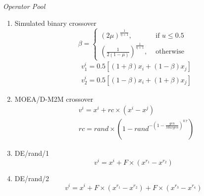\documentclass[journal]{IEEEtran}
\begin{document}
\textit{Operator Pool}
\begin{enumerate}
  \item Simulated binary crossover
        \begin{equation}
          \label{eq:sbx}
          \beta=\left\{\begin{array}{cl}
            (2 \mu)^{\frac{1}{\eta+1}},                         & \text { if } u \leq 0.5 \\
            \left(\frac{1}{2(1-\mu)}\right)^{\frac{1}{\eta+1}}, & \text { otherwise }
          \end{array}\right.
        \end{equation}
        \begin{equation}
          \begin{aligned}
             & v^i_1=0.5\left[(1+\beta) x_{i}+(1-\beta) x_{j}\right] \\
             & v^i_2=0.5\left[(1-\beta) x_{i}+(1+\beta) x_{j}\right]
          \end{aligned}
        \end{equation}
  \item MOEA/D-M2M crossover
        \begin{align}
           & v^{i}=x^{i}+rc \times \left(x^{i}-x^{j}\right)                                                      \\
           & rc={rand} \times \left(1-{rand}^{-\left(1-\frac{\textit{gen}}{\textit{Maxgen}}\right)^{0.7}}\right)
          \label{c_op:m2m}
        \end{align}
  \item DE/rand/1
        \begin{equation}
          v^{i}=x^{i}+F \times\left(x^{r_{1}}-x^{r_{2}}\right)
          \label{op:de1}
        \end{equation}
  \item DE/rand/2
        \begin{equation}
          v^{i}=x^{i}+F \times\left(x^{r_1}-x^{r_2}\right)+F \times\left(x^{r_3}-x^{r_4}\right)
          \label{op:de2}
        \end{equation}
\end{enumerate}
\end{document}
